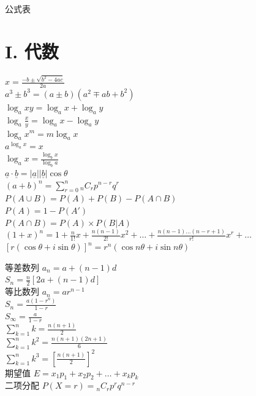 \pagecolor{PageColor}
\begin{center}
  {\fontsize{30pt}{26pt}\selectfont 公式表}
\end{center}
\separator
\section*{I. 代数}

\begin{minipage}[t]{0.5\textwidth}
$x = \frac{-b \pm \sqrt{b^{2}-4ac}}{2a}$ \\
$a^{3} \pm b^{3} = (a \pm b)(a^{2} \mp ab + b^{2})$ \\
$\log_{a}xy = \log_{a}x + \log_{a}y$ \\
$\log_{a}\frac{x}{y} = \log_{a}x - \log_{a}y$ \\
$\log_{a}x^{m} = m \log_{a}x$ \\
$a^{\log_{a}x} = x$ \\
$\log_{a}x = \frac{\log_{b}x}{\log_{b}a}$ \\[8pt]
$\underline{a} \cdot \underline{b} = |\underline{a}||\underline{b}| \cos\theta$ \\[8pt]
$(a+b)^{n} = \sum_{r=0}^{n} {}_{n}C_{r} p^{n-r} q^{r}$ \\[8pt]
$P(A \cup B) = P(A) + P(B) - P(A \cap B)$ \\
$P(A) = 1 - P(A')$ \\
$P(A \cap B) = P(A) \times P(B|A)$ \\[8pt]
$(1+x)^{n} = 1 + \frac{n}{1!}x + \frac{n(n-1)}{2!}x^{2} + \dots + \frac{n(n-1)\dots(n-r+1)}{r!}x^{r} + \dots$ \\[8pt]
$[r(\cos\theta + i \sin\theta)]^{n} = r^{n}(\cos n\theta + i \sin n\theta)$
\end{minipage}
\begin{minipage}[t]{0.5\textwidth}
等差数列 \quad $a_{n} = a + (n-1)d$ \\
\phantom{等差数列} \quad $S_{n} = \frac{n}{2}[2a + (n-1)d]$ \\[10pt]
等比数列 \quad $a_{n} = ar^{n-1}$ \\
\phantom{等比数列} \quad $S_{n} = \frac{a(1-r^{n})}{1-r}$ \\
\phantom{等比数列} \quad $S_{\infty} = \frac{a}{1-r}$ \\[10pt]
$\sum_{k=1}^{n}k = \frac{n(n+1)}{2}$ \\
$\sum_{k=1}^{n}k^{2} = \frac{n(n+1)(2n+1)}{6}$ \\
$\sum_{k=1}^{n}k^{3} = [\frac{n(n+1)}{2}]^{2}$ \\[10pt]
期望值 \quad $E = x_{1}p_{1} + x_{2}p_{2} + \dots + x_{k}p_{k}$ \\[8pt]
二项分配 \quad $P(X=r) = {}_{n}C_{r} p^{r} q^{n-r}$
\end{minipage}

